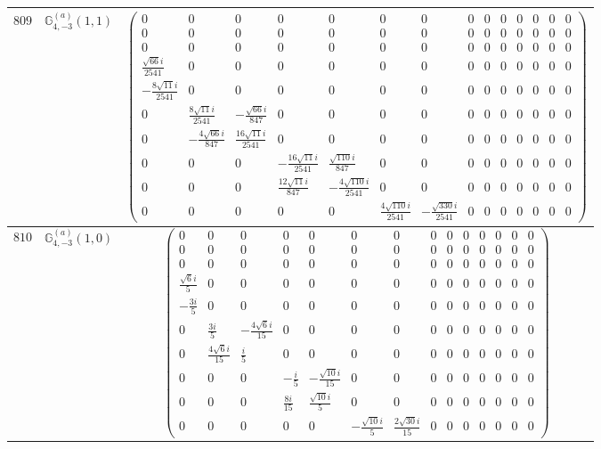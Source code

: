 \documentclass[fleqn,8pt,landscape]{jsarticle}
\begin{document}
\begin{center}
\begin{longtable}{ccc}
$ 809 $ & $ \mathbb{G}_{4,-3}^{(a)}(1,1) $ & $ \begin{pmatrix} 0 & 0 & 0 & 0 & 0 & 0 & 0 & 0 & 0 & 0 & 0 & 0 & 0 & 0 \\ 0 & 0 & 0 & 0 & 0 & 0 & 0 & 0 & 0 & 0 & 0 & 0 & 0 & 0 \\ 0 & 0 & 0 & 0 & 0 & 0 & 0 & 0 & 0 & 0 & 0 & 0 & 0 & 0 \\ \frac{\sqrt{66} i}{2541} & 0 & 0 & 0 & 0 & 0 & 0 & 0 & 0 & 0 & 0 & 0 & 0 & 0 \\ - \frac{8 \sqrt{11} i}{2541} & 0 & 0 & 0 & 0 & 0 & 0 & 0 & 0 & 0 & 0 & 0 & 0 & 0 \\ 0 & \frac{8 \sqrt{11} i}{2541} & - \frac{\sqrt{66} i}{847} & 0 & 0 & 0 & 0 & 0 & 0 & 0 & 0 & 0 & 0 & 0 \\ 0 & - \frac{4 \sqrt{66} i}{847} & \frac{16 \sqrt{11} i}{2541} & 0 & 0 & 0 & 0 & 0 & 0 & 0 & 0 & 0 & 0 & 0 \\ 0 & 0 & 0 & - \frac{16 \sqrt{11} i}{2541} & \frac{\sqrt{110} i}{847} & 0 & 0 & 0 & 0 & 0 & 0 & 0 & 0 & 0 \\ 0 & 0 & 0 & \frac{12 \sqrt{11} i}{847} & - \frac{4 \sqrt{110} i}{2541} & 0 & 0 & 0 & 0 & 0 & 0 & 0 & 0 & 0 \\ 0 & 0 & 0 & 0 & 0 & \frac{4 \sqrt{110} i}{2541} & - \frac{\sqrt{330} i}{2541} & 0 & 0 & 0 & 0 & 0 & 0 & 0 \end{pmatrix} $ \\ \hline
$ 810 $ & $ \mathbb{G}_{4,-3}^{(a)}(1,0) $ & $ \begin{pmatrix} 0 & 0 & 0 & 0 & 0 & 0 & 0 & 0 & 0 & 0 & 0 & 0 & 0 & 0 \\ 0 & 0 & 0 & 0 & 0 & 0 & 0 & 0 & 0 & 0 & 0 & 0 & 0 & 0 \\ 0 & 0 & 0 & 0 & 0 & 0 & 0 & 0 & 0 & 0 & 0 & 0 & 0 & 0 \\ \frac{\sqrt{6} i}{5} & 0 & 0 & 0 & 0 & 0 & 0 & 0 & 0 & 0 & 0 & 0 & 0 & 0 \\ - \frac{3 i}{5} & 0 & 0 & 0 & 0 & 0 & 0 & 0 & 0 & 0 & 0 & 0 & 0 & 0 \\ 0 & \frac{3 i}{5} & - \frac{4 \sqrt{6} i}{15} & 0 & 0 & 0 & 0 & 0 & 0 & 0 & 0 & 0 & 0 & 0 \\ 0 & \frac{4 \sqrt{6} i}{15} & \frac{i}{5} & 0 & 0 & 0 & 0 & 0 & 0 & 0 & 0 & 0 & 0 & 0 \\ 0 & 0 & 0 & - \frac{i}{5} & - \frac{\sqrt{10} i}{15} & 0 & 0 & 0 & 0 & 0 & 0 & 0 & 0 & 0 \\ 0 & 0 & 0 & \frac{8 i}{15} & \frac{\sqrt{10} i}{5} & 0 & 0 & 0 & 0 & 0 & 0 & 0 & 0 & 0 \\ 0 & 0 & 0 & 0 & 0 & - \frac{\sqrt{10} i}{5} & \frac{2 \sqrt{30} i}{15} & 0 & 0 & 0 & 0 & 0 & 0 & 0 \end{pmatrix} $ \\ \hline

\end{longtable}
\end{center}
\end{document}
